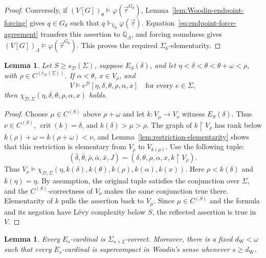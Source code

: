 \documentclass[11pt,a4paper]{amsart}
\newcommand{\restr}{\mathbin{\upharpoonright}}
\newcommand{\crit}{\operatorname{crit}}
\theoremstyle{plain}
\newtheorem{lemma}[theorem]{Lemma}
\theoremstyle{definition}
\theoremstyle{remark}
\begin{document}
\begin{proof}
Conversely, if $(V[G])_\theta\models\varphi(\vec\tau^{G_\theta})$, Lemma~\ref{lem:Woodin-endpoint-forcing} gives $q\in G_\theta$ such that $q\Vdash_{\mathbb Q_\theta}\varphi(\vec\tau)$.  Equation~\eqref{eq:endpoint-force-agreement} transfers this assertion to $\mathbb Q_\Lambda$, and forcing soundness gives $(V[G])_\Lambda\models\varphi(\vec\tau^{G_\theta})$.  This proves the required $\Sigma_k$-elementarity.
\end{proof}

\begin{lemma}\label{lem:finite-reflection}
{Let $S\geq s_{\mathcal D}(\Sigma)$, suppose $E_S(\delta)$, and let $\eta<\delta<\theta<\theta+\omega<\rho$, with $\rho\in C^{(c_{\mathcal D}(\Sigma))}$.  If $\alpha<\theta$, $x\in V_\rho$, and
\[
V\models e^{\mathcal D}
[\eta,\delta,\theta,\rho,\alpha,x]
\quad\text{for every }e\in\Sigma,
\]
then $\chi_{\mathcal D,\Sigma}(\eta,\delta,\theta,\rho,\alpha,x)$ holds.}
\end{lemma}

\begin{proof}
Choose $\mu\in C^{(S)}$ above $\rho+\omega$ and let $k:V_\mu\to V_\nu$ witness $E_S(\delta)$.  Thus $\nu\in C^{(S)}$, $\crit(k)=\delta$, and $k(\delta)>\mu>\rho$.  The graph of $k\restr V_\rho$ has rank below $k(\rho)+\omega=k(\rho+\omega)<\nu$, and Lemma~\ref{lem:restriction-elementarity} shows that this restriction is elementary from $V_\rho$ to $V_{k(\rho)}$.  Use the following tuple:
\[
(\bar\delta,\bar\theta,\bar\rho,\bar\alpha,\bar x,J)
=(\delta,\theta,\rho,\alpha,x,k\restr V_\rho).
\]
Thus $V_\nu\models{\chi_{\mathcal D,\Sigma}}(\eta,k(\delta),k(\theta),k(\rho),k(\alpha),k(x))$.
Here $\rho<k(\delta)$ and $k(\eta)=\eta$.  By assumption, the original tuple satisfies the conjunction over $\Sigma$, and the $C^{(S)}$-correctness of $V_\nu$ makes the same conjunction true there.  Elementarity of $k$ pulls the assertion back to $V_\mu$.  Since $\mu\in C^{(S)}$ and the formula and its negation have L\'evy complexity below $S$, the reflected assertion is true in $V$.
\end{proof}

\begin{lemma}\label{lem:ordinary-correct-supercompact}
Every $E_s$-cardinal is $\Sigma_{s+2}$-correct.  Moreover, there is a fixed $d_{\mathrm W}<\omega$ such that every $E_s$-cardinal is supercompact in Woodin's sense whenever $s\geq d_{\mathrm W}$.
\end{lemma}
\end{document}
